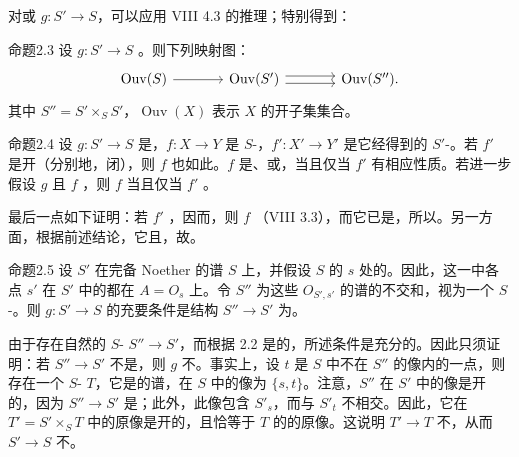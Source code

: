 对或 $g:S'\to S$，可以应用 VIII 4.3 的推理；特别得到：
\begin{SGAresult}{命题}{2.3}
设 $g:S'\to S$ 。则下列映射图：
\[
\begin{tikzcd}[column sep=large]
\operatorname{Ouv}(S)\arrow[r]&\operatorname{Ouv}(S')\arrow[r,shift left=.6ex]\arrow[r,shift right=.6ex]&\operatorname{Ouv}(S'').
\end{tikzcd}
\]
其中 $S''=S'\times_S S'$，$\operatorname{Ouv}(X)$ 表示 $X$ 的开子集集合。
\end{SGAresult}
\begin{SGAresult}{命题}{2.4}
设 $g:S'\to S$ 是，$f:X\to Y$ 是 $S$-，$f':X'\to Y'$ 是它经得到的 $S'$-。若 $f'$ 是开（分别地，闭），则 $f$ 也如此。$f$ 是、或，当且仅当 $f'$ 有相应性质。若进一步假设 $g$ 且 $f$ ，则 $f$ 当且仅当 $f'$ 。
\end{SGAresult}
最后一点如下证明：若 $f'$ ，因而，则 $f$ （VIII 3.3），而它已是，所以。另一方面，根据前述结论，它且，故。
\begin{SGAresult}{命题}{2.5}
设 $S'$ 在完备 Noether 的谱 $S$ 上，并假设 $S$ 的 $s$ 处的。因此，这一中各点 $s'$ 在 $S'$ 中的都在 $A=O_s$ 上。令 $S''$ 为这些 $O_{S',s'}$ 的谱的不交和，视为一个 $S$-。则 $g:S'\to S$ 的充要条件是结构 $S''\to S'$ 为。
\end{SGAresult}
由于存在自然的 $S$- $S''\to S'$，而根据 2.2 是的，所述条件是充分的。因此只须证明：若 $S''\to S'$ 不是，则 $g$ 不。事实上，设 $t$ 是 $S$ 中不在 $S''$ 的像内的一点，则存在一个 $S$- $T$，它是的谱，在 $S$ 中的像为 $\{s,t\}$。注意，$S''$ 在 $S'$ 中的像是开的，因为 $S''\to S'$ 是；此外，此像包含 $S'_s$，而与 $S'_t$ 不相交。因此，它在 $T'=S'\times_S T$ 中的原像是开的，且恰等于 $T$ 的的原像。这说明 $T'\to T$ 不，从而 $S'\to S$ 不。

